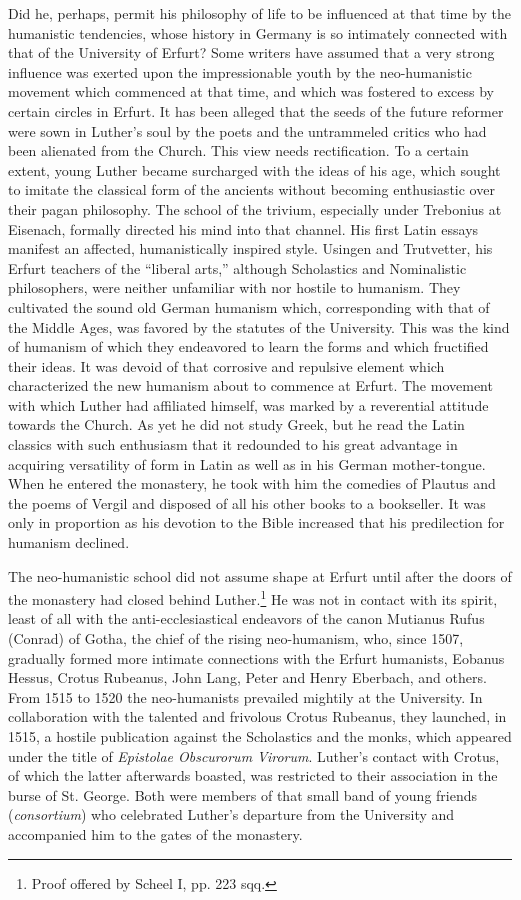 Did he, perhaps, permit his philosophy of life to be influenced
at that time by the humanistic tendencies, whose history in Germany
is so intimately connected with that of the University of
Erfurt? Some writers have assumed that a very strong influence
was exerted upon the impressionable youth by the neo-humanistic
movement which commenced at that time, and which was fostered
to excess by certain circles in Erfurt. It has been alleged that the
seeds of the future reformer were sown in Luther’s soul by the poets
and the untrammeled critics who had been alienated from the
Church. This view needs rectification. To a certain extent, young
Luther became surcharged with the ideas of his age, which sought
to imitate the classical form of the ancients without becoming enthusiastic
over their pagan philosophy. The school of the trivium,
especially under Trebonius at Eisenach, formally directed his mind
into that channel. His first Latin essays manifest an affected, humanistically
inspired style. Usingen and Trutvetter, his Erfurt
teachers of the “liberal arts,” although Scholastics and Nominalistic
philosophers, were neither unfamiliar with nor hostile to humanism.
They cultivated the sound old German humanism which, corresponding
with that of the Middle Ages, was favored by the statutes
of the University. This was the kind of humanism of which they
endeavored to learn the forms and which fructified their ideas. It
was devoid of that corrosive and repulsive element which characterized
the new humanism about to commence at Erfurt. The
movement with which Luther had affiliated himself, was marked
by a reverential attitude towards the Church. As yet he did not
study Greek, but he read the Latin classics with such enthusiasm that
it redounded to his great advantage in acquiring versatility of form
in Latin as well as in his German mother-tongue. When he entered
the monastery, he took with him the comedies of Plautus and the
poems of Vergil and disposed of all his other books to a bookseller.
It was only in proportion as his devotion to the Bible increased
that his predilection for humanism declined.

The neo-humanistic school did not assume shape at Erfurt until
after the doors of the monastery had closed behind Luther.\footnote{Proof offered by Scheel I, pp. 223 sqq.}
He was not in contact with its spirit, least of all with the anti-ecclesiastical
endeavors of the canon Mutianus Rufus (Conrad) of Gotha,
the chief of the rising neo-humanism, who, since 1507, gradually
formed more intimate connections with the Erfurt humanists,
Eobanus Hessus, Crotus Rubeanus, John Lang, Peter and Henry
Eberbach, and others. From 1515 to 1520 the neo-humanists prevailed
mightily at the University. In collaboration with the talented
and frivolous Crotus Rubeanus, they launched, in 1515, a hostile
publication against the Scholastics and the monks, which appeared
under the title of \textit{Epistolae Obscurorum Virorum}. Luther’s contact
with Crotus, of which the latter afterwards boasted, was restricted
to their association in the burse of St. George. Both were members of
that small band of young friends (\textit{consortium}) who celebrated
Luther’s departure from the University and accompanied him to the
gates of the monastery.

